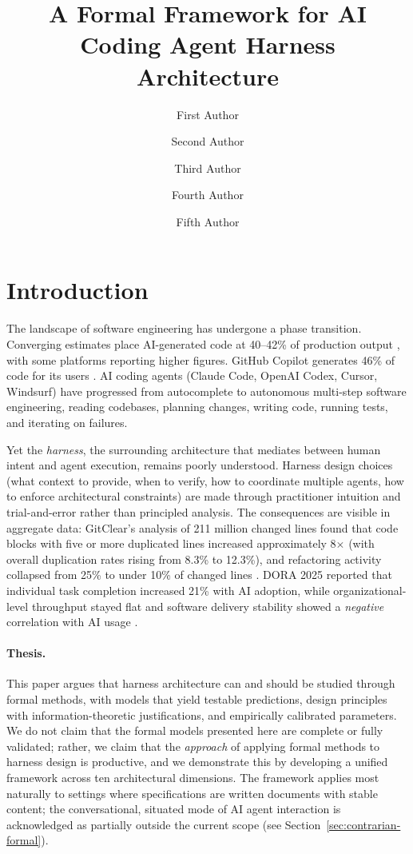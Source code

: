 \documentclass[11pt, a4paper]{googledeepmind}
\title{A Formal Framework for AI Coding Agent Harness Architecture}
\author[1]{First Author}
\author[2]{Second Author}
\author[2]{Third Author}
\author[1]{Fourth Author}
\author[1]{Fifth Author}
\affil[*]{Equal Contribution}
\affil[1]{Affiliation 1}
\affil[2]{Affiliation 2}
\begin{document}
\maketitle

\section{Introduction}
\label{sec:intro}

The landscape of software engineering has undergone a phase transition. Converging estimates place AI-generated code at 40--42\% of production output \citep{gitclear2025, sonar2026}, with some platforms reporting higher figures. GitHub Copilot generates 46\% of code for its users \citep{github2024rct}. AI coding agents (Claude Code, OpenAI Codex, Cursor, Windsurf) have progressed from autocomplete to autonomous multi-step software engineering, reading codebases, planning changes, writing code, running tests, and iterating on failures.

Yet the \emph{harness}, the surrounding architecture that mediates between human intent and agent execution, remains poorly understood. Harness design choices (what context to provide, when to verify, how to coordinate multiple agents, how to enforce architectural constraints) are made through practitioner intuition and trial-and-error rather than principled analysis. The consequences are visible in aggregate data: GitClear's analysis of 211 million changed lines found that code blocks with five or more duplicated lines increased approximately 8$\times$ (with overall duplication rates rising from 8.3\% to 12.3\%), and refactoring activity collapsed from 25\% to under 10\% of changed lines \citep{gitclear2025}. DORA 2025 reported that individual task completion increased 21\% with AI adoption, while organizational-level throughput stayed flat and software delivery stability showed a \emph{negative} correlation with AI usage \citep{dora2025}.

\paragraph{Thesis.} This paper argues that harness architecture can and should be studied through formal methods, with models that yield testable predictions, design principles with information-theoretic justifications, and empirically calibrated parameters. We do not claim that the formal models presented here are complete or fully validated; rather, we claim that the \emph{approach} of applying formal methods to harness design is productive, and we demonstrate this by developing a unified framework across ten architectural dimensions. The framework applies most naturally to settings where specifications are written documents with stable content; the conversational, situated mode of AI agent interaction \citep{suchman1987plans} is acknowledged as partially outside the current scope (see Section~\ref{sec:contrarian-formal}).
\end{document}
